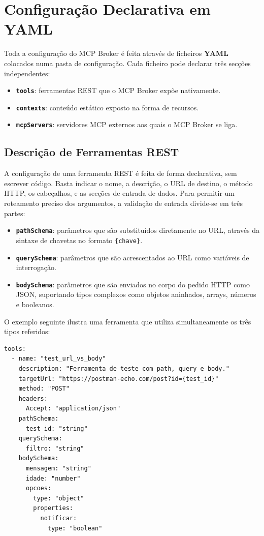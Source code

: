 \section{Configuração Declarativa em YAML}

Toda a configuração do MCP Broker é feita através de ficheiros \textbf{YAML} colocados numa pasta de configuração. Cada ficheiro pode declarar três secções independentes:

\begin{itemize}
    \item \textbf{\texttt{tools}}: ferramentas REST que o MCP Broker expõe nativamente.
    \item \textbf{\texttt{contexts}}: conteúdo estático exposto na forma de recursos.
    \item \textbf{\texttt{mcpServers}}: servidores MCP externos aos quais o MCP Broker se liga.
\end{itemize}

\subsection{Descrição de Ferramentas REST}

A configuração de uma ferramenta REST é feita de forma declarativa, sem escrever código. Basta indicar o nome, a descrição, o URL de destino, o método HTTP, os cabeçalhos, e as secções de entrada de dados. Para permitir um roteamento preciso dos argumentos, a validação de entrada divide-se em três partes:

\begin{itemize}
    \item \textbf{\texttt{pathSchema}}: parâmetros que são substituídos diretamente no URL, através da sintaxe de chavetas no formato \texttt{\{chave\}}.
    \item \textbf{\texttt{querySchema}}: parâmetros que são acrescentados ao URL como variáveis de interrogação.
    \item \textbf{\texttt{bodySchema}}: parâmetros que são enviados no corpo do pedido HTTP como JSON, suportando tipos complexos como objetos aninhados, arrays, números e booleanos.
\end{itemize}

O exemplo seguinte ilustra uma ferramenta que utiliza simultaneamente os três tipos referidos:

\begin{lstlisting}[caption={Exemplo de ferramenta REST configurada via YAML.}]
tools:
  - name: "test_url_vs_body"
    description: "Ferramenta de teste com path, query e body."
    targetUrl: "https://postman-echo.com/post?id={test_id}"
    method: "POST"
    headers:
      Accept: "application/json"
    pathSchema:
      test_id: "string"
    querySchema:
      filtro: "string"
    bodySchema:
      mensagem: "string"
      idade: "number"
      opcoes:
        type: "object"
        properties:
          notificar:
            type: "boolean"
\end{lstlisting}

